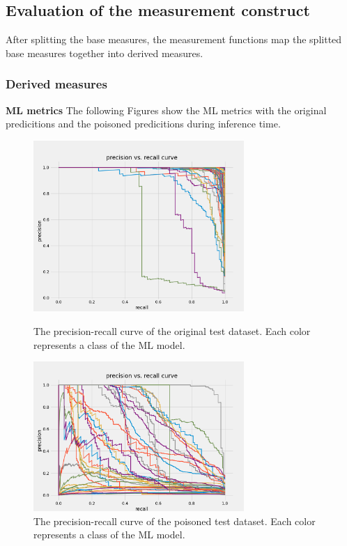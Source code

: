 \subsection{Evaluation of the measurement construct}

After splitting the base measures, the measurement functions map the splitted base measures together into derived measures.

\subsubsection*{Derived measures}

\textbf{ML metrics} The following Figures show the ML metrics with the original predicitions and the poisoned predicitions during inference time.


\begin{figure}[!tbp]
  \centering
  \begin{minipage}[b]{0.4\textwidth}
    \includegraphics[width=8cm]{pictures/precision_recall_curve.png}
    \caption{The precision-recall curve of the original test dataset. Each color represents a class of the ML model.}
    \label{fig:precision_recall_curve}
  \end{minipage}
  \hfill
  \begin{minipage}[b]{0.4\textwidth}
    \includegraphics[width=8cm]{pictures/poisoned_precision_recall.png}
    \caption{The precision-recall curve of the poisoned test dataset. Each color represents a class of the ML model.}
    \label{fig:poisoned_precision_recall}
  \end{minipage}
\end{figure}

